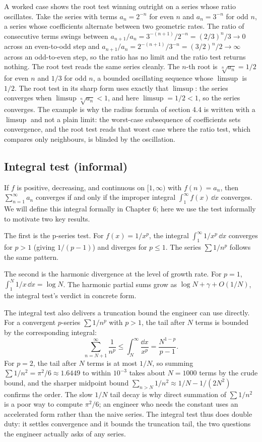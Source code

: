 A worked case shows the root test winning outright on a series whose ratio
oscillates. Take the series with terms $a_{n} = 2^{-n}$ for even $n$ and
$a_{n} = 3^{-n}$ for odd $n$, a series whose coefficients alternate
between two geometric rates. The ratio of consecutive terms swings between
$a_{n+1}/a_{n} = 3^{-(n+1)}/2^{-n} = (2/3)^{n}/3 \to 0$ across an
even-to-odd step and $a_{n+1}/a_{n} = 2^{-(n+1)}/3^{-n} = (3/2)^{n}/2 \to
\infty$ across an odd-to-even step, so the ratio has no limit and the
ratio test returns nothing. The root test reads the same series cleanly.
The $n$-th root is $\sqrt[n]{a_{n}} = 1/2$ for even $n$ and $1/3$ for odd
$n$, a bounded oscillating sequence whose $\limsup$ is $1/2$. The root
test in its sharp form uses exactly that $\limsup$: the series converges
when $\limsup \sqrt[n]{a_{n}} < 1$, and here $\limsup = 1/2 < 1$, so the
series converges. The example is why the radius formula of section 4.4 is
written with a $\limsup$ and not a plain limit: the worst-case
subsequence of coefficients sets convergence, and the root test reads that
worst case where the ratio test, which compares only neighbours, is
blinded by the oscillation.

\subsection{Integral test (informal)}

If $f$ is positive, decreasing, and continuous on $[1, \infty)$ with
$f(n) = a_{n}$, then $\sum_{n=1}^{\infty} a_{n}$ converges if and only
if the improper integral $\int_{1}^{\infty} f(x) \, \dd x$ converges.
We will define this integral formally in Chapter 6; here we use the
test informally to motivate two key results.

The first is the p-series test. For $f(x) = 1/x^{p}$, the integral
$\int_{1}^{\infty} 1/x^{p} \, \dd x$ converges for $p > 1$ (giving
$1/(p-1)$) and diverges for $p \leq 1$. The series $\sum 1/n^{p}$
follows the same pattern.

The second is the harmonic divergence at the level of growth rate.
For $p = 1$, $\int_{1}^{N} 1/x \, \dd x = \log N$. The harmonic
partial sums grow as $\log N + \gamma + O(1/N)$, the integral test's
verdict in concrete form.

The integral test also delivers a truncation bound the engineer can use
directly. For a convergent $p$-series $\sum 1/n^{p}$ with $p > 1$, the
tail after $N$ terms is bounded by the corresponding integral:
\[
\sum_{n=N+1}^{\infty} \frac{1}{n^{p}} \leq \int_{N}^{\infty}
\frac{\dd x}{x^{p}} = \frac{N^{1-p}}{p - 1}.
\]
For $p = 2$, the tail after $N$ terms is at most $1/N$, so summing
$\sum 1/n^{2} = \pi^{2}/6 \approx 1.6449$ to within $10^{-3}$ takes
about $N = 1000$ terms by the crude bound, and the sharper midpoint
bound $\sum_{n > N} 1/n^{2} \approx 1/N - 1/(2N^{2})$ confirms the
order. The slow $1/N$ tail decay is why direct summation of $\sum
1/n^{2}$ is a poor way to compute $\pi^{2}/6$; an engineer who needs
the constant uses an accelerated form rather than the naive series. The
integral test thus does double duty: it settles convergence and it
bounds the truncation tail, the two questions the engineer actually
asks of any series.

